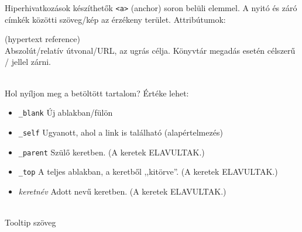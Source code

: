 \documentclass[usenames,dvipsnames,aspectratio=169]{beamer}
\newcommand{\kiemel}[1]{{\color{kiemelesszin}#1}}
\begin{document}
\begin{frame}
  Hiperhivatkozások készíthetők \texttt{<a>} (anchor) soron belüli elemmel. A nyitó és záró címkék közötti szöveg/kép az érzékeny terület. Attribútumok:
  \begin{description}[m]
    \item[\texttt{href}] (hypertext reference) \hfill \\ Abszolút/relatív útvonal/URL, az ugrás célja. Könyvtár megadás esetén célszerű / jellel zárni.
    \item[\texttt{target}] \hfill \\ Hol nyíljon meg a betöltött tartalom? Értéke lehet:
    \begin{itemize}
      \item \texttt{\_blank} Új ablakban/fülön
      \item \texttt{\_self} Ugyanott, ahol a link is található (alapértelmezés)
      \item \texttt{\_parent} Szülő keretben. (A keretek \kiemel{ELAVULTAK}.)
      \item \texttt{\_top} A teljes ablakban, a keretből ,,kitörve''. (A keretek \kiemel{ELAVULTAK}.)
      \item \emph{keretnév} Adott nevű keretben. (A keretek \kiemel{ELAVULTAK}.)
    \end{itemize}
    \item[\texttt{title}] \hfill \\ Tooltip szöveg
  \end{description}
\end{frame}
\end{document}
